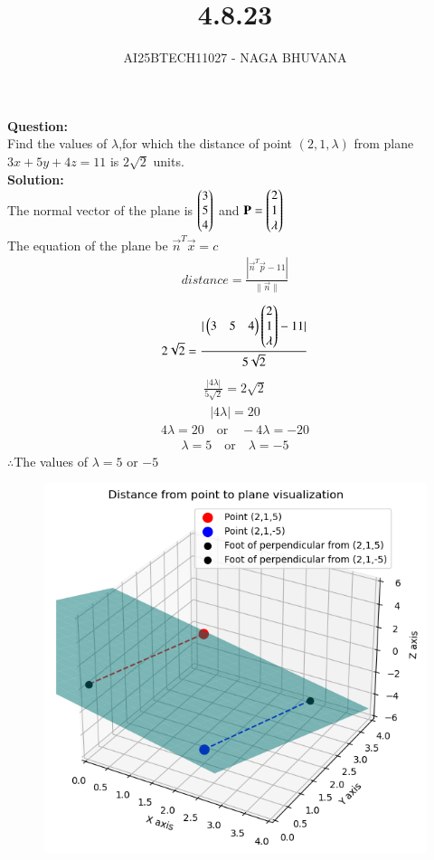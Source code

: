 \documentclass[journal,12pt,onecolumn]{IEEEtran}
\begin{document}
\title{4.8.23}
\author{AI25BTECH11027 - NAGA BHUVANA}
{\let\newpage\relax\maketitle}
\noindent
		\textbf{Question:}\\
Find the values of $\lambda$,for which the distance of point $(2,1,\lambda)$ from plane $3x+5y+4z=11$ is $2\sqrt{2}$ units.\\
\textbf{Solution:}\\
The normal vector of the plane is $\begin{pmatrix}3\\5\\4\end{pmatrix}$ and $\mathbf{P}=\begin{pmatrix}2\\1\\\lambda\end{pmatrix}$\\
The equation of the plane be $\vec{n}^T\vec{x}=c$
\begin{align}
    distance=\frac{|\vec{n}^T\vec{p}-11|}{\|\vec{n}\|}
\end{align}
\begin{align}
    2\sqrt{2}=\frac{|\begin{pmatrix}3&5&4\end{pmatrix}\begin{pmatrix}2\\1\\\lambda\end{pmatrix}-11|}{5\sqrt{2}}
\end{align}
        \begin{align}
            \frac{|4\lambda|}{5\sqrt{2}}=2\sqrt{2}
        \end{align}
        \begin{align}
            |4\lambda|=20
        \end{align}
        \begin{align}
            4\lambda=20  \quad \text{or} \quad -4\lambda=-20
        \end{align}
        \begin{align}
            \lambda=5 \quad \text{or} \quad \lambda=-5
        \end{align}
        $\therefore $The values of $\lambda=5$ or $-5$
	\begin{figure}[H]
		\centering
		\includegraphics[width=0.7\linewidth]{figs/fig1.png}
		\caption{}
		\label{fig}
	\end{figure}
\end{document}
